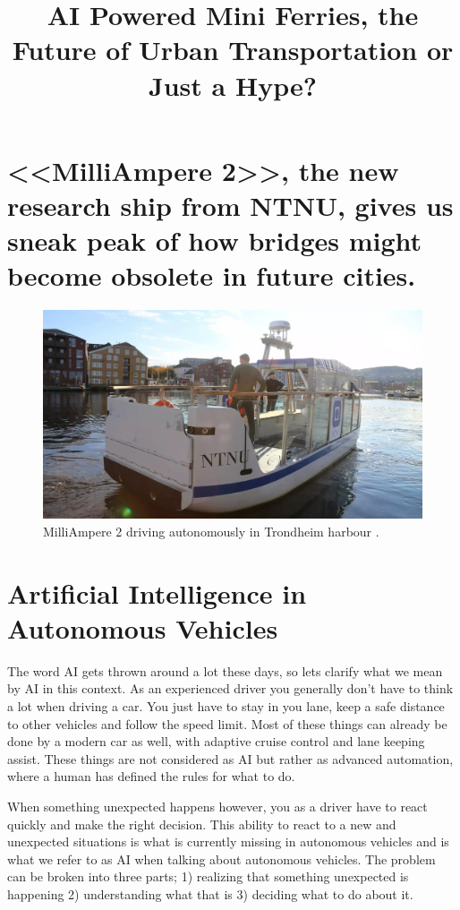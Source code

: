 \documentclass{iopconfser}
\begin{document}
 

\title{AI Powered Mini Ferries, the Future of Urban Transportation or Just a Hype?}

\section*{<<MilliAmpere 2>>, the new research ship from NTNU, gives us sneak peak of how bridges might become obsolete in future cities.}

\begin{figure}[H]
    \centering
    \includegraphics[width=\textwidth]{figures/milliampere.jpg}
    \caption{MilliAmpere 2 driving autonomously in Trondheim harbour \cite{hauglandDetSomHar2022}.}
\end{figure}

\section*{Artificial Intelligence in Autonomous Vehicles}
The word AI gets thrown around a lot these days, so lets clarify what we mean by AI in this context.
As an experienced driver you generally don't have to think a lot when driving a car.
You just have to stay in you lane, keep a safe distance to other vehicles and follow the speed limit.
Most of these things can already be done by a modern car as well, with adaptive cruise control and lane keeping assist.
These things are not considered as AI but rather as advanced automation, where a human has defined the rules for what to do.

When something unexpected happens however, you as a driver have to react quickly and make the right decision.
This ability to react to a new and unexpected situations is what is currently missing in autonomous vehicles and is what we refer to as AI when talking about autonomous vehicles.
The problem can be broken into three parts; 1) realizing that something unexpected is happening 2) understanding what that is 3) deciding what to do about it.
\end{document}
